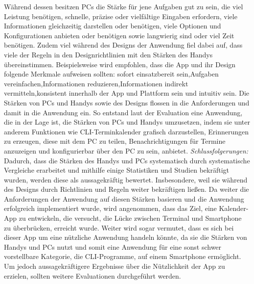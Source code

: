 		\newline%
		Während dessen besitzen PCs die Stärke für jene Aufgaben gut zu sein, die viel Leistung benötigen, schnelle, präzise oder vielfältige Eingaben erfordern, viele Informationen gleichzeitig darstellen oder benötigen, viele Optionen und Konfigurationen anbieten oder benötigen sowie langwierig sind oder viel Zeit benötigen.
		\newline%
		Zudem viel während des Designs der Anwendung fiel dabei auf, dass viele der Regeln in den Designrichtlinien mit den Stärken des Handys übereinstimmen. Beispielsweise wird empfohlen, dass die App und ihr Design folgende Merkmale aufweisen sollten: \glqq sofort einsatzbereit sein\grqq{},\glqq Aufgaben vereinfachen\grqq{},\glqq Informationen reduzieren\grqq{},\glqq Informationen indirekt vermitteln\grqq{},\glqq konsistent innerhalb der App und Plattform sein\grqq{} und \glqq intuitiv sein\grqq{}.
	\newline
	Die Stärken von PCs und Handys sowie des Designs flossen in die Anforderungen und damit in die Anwendung ein. So entstand laut der Evaluation eine Anwendung, die in der Lage ist, die Stärken von PCs und Handys umzusetzen, indem sie unter anderem Funktionen wie CLI-Terminkalender grafisch darzustellen, Erinnerungen zu erzeugen, diese mit dem PC zu teilen, Benachrichtigungen für Termine anzuzeigen und konfigurierbar über den PC zu sein, anbietet.
\newline%
\myNewSection
\textit{Schlussfolgerungen:} 
Dadurch, dass die Stärken des Handys und PCs systematisch durch systematische Vergleiche erarbeitet und mithilfe einige Statistiken und Studien bekräftigt wurden, werden diese als aussagekräftig bewertet. Insbesondere, weil sie während des Designs durch Richtlinien und Regeln weiter bekräftigen ließen.
	Da weiter die Anforderungen der Anwendung auf diesen Stärken basieren und die Anwendung erfolgreich implementiert wurde, wird angenommen, dass das Ziel, eine Kalender-App zu entwickeln, die versucht, die Lücke zwischen Terminal und Smartphone zu überbrücken, erreicht wurde. Weiter wird sogar vermutet, dass es sich bei dieser App um eine nützliche Anwendung handeln könnte, da sie die Stärken von Handys und PCs nutzt und somit eine Anwendung für eine sonst schwer vorstellbare Kategorie, die CLI-Programme, auf einem Smartphone ermöglicht.  Um jedoch aussagekräftigere Ergebnisse über die Nützlichkeit der App zu erzielen, sollten weitere Evaluationen durchgeführt werden.
\newline%
